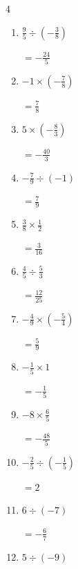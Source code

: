 \begin{multicols}{4}
\begin{enumerate}
        $\displaystyle =-\frac{21}{10}$

  \item $\displaystyle \frac{9}{5}\div{}\left(-\frac{3}{8}\right)$

        $\displaystyle =-\frac{24}{5}$

  \item $\displaystyle -1\times{}\left(-\frac{7}{8}\right)$

        $\displaystyle =\frac{7}{8}$

  \item $\displaystyle 5\times{}\left(-\frac{8}{3}\right)$

        $\displaystyle =-\frac{40}{3}$

  \item $\displaystyle -\frac{7}{9}\div{}\left(-1\right)$

        $\displaystyle =\frac{7}{9}$

  \item $\displaystyle \frac{3}{8}\times{}\frac{1}{2}$

        $\displaystyle =\frac{3}{16}$

\columnbreak %

\resetques

  \item $\displaystyle \frac{4}{5}\div{}\frac{5}{3}$

        $\displaystyle =\frac{12}{25}$

  \item $\displaystyle -\frac{4}{9}\times{}\left(-\frac{5}{4}\right)$

        $\displaystyle =\frac{5}{9}$

  \item $\displaystyle -\frac{1}{5}\times{}1$

        $\displaystyle =-\frac{1}{5}$

  \item $\displaystyle -8\times{}\frac{6}{5}$

        $\displaystyle =-\frac{48}{5}$

  \item $\displaystyle -\frac{2}{5}\div{}\left(-\frac{1}{5}\right)$

        $\displaystyle =2$

  \item $\displaystyle 6\div{}\left(-7\right)$

        $\displaystyle =-\frac{6}{7}$

  \item $\displaystyle 5\div{}\left(-9\right)$


\end{enumerate}
\end{multicols}
